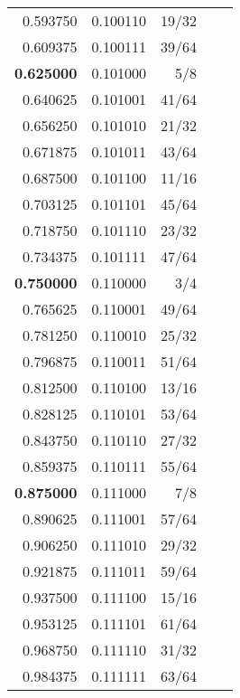 \documentclass[a4paper]{article}
\begin{document}
\begin{tabular}{| r | r | r | r | r |}
0.593750&0.100110&19/32\\
0.609375&0.100111&39/64\\
\textbf{0.625000}&0.101000&5/8\\
0.640625&0.101001&41/64\\
0.656250&0.101010&21/32\\
0.671875&0.101011&43/64\\
0.687500&0.101100&11/16\\
0.703125&0.101101&45/64\\
0.718750&0.101110&23/32\\
0.734375&0.101111&47/64\\
\textbf{0.750000}&0.110000&3/4\\
0.765625&0.110001&49/64\\
0.781250&0.110010&25/32\\
0.796875&0.110011&51/64\\
0.812500&0.110100&13/16\\
0.828125&0.110101&53/64\\
0.843750&0.110110&27/32\\
0.859375&0.110111&55/64\\
\textbf{0.875000}&0.111000&7/8\\
0.890625&0.111001&57/64\\
0.906250&0.111010&29/32\\
0.921875&0.111011&59/64\\
0.937500&0.111100&15/16\\
0.953125&0.111101&61/64\\
0.968750&0.111110&31/32\\
0.984375&0.111111&63/64\\

\end{tabular}
\end{document}
